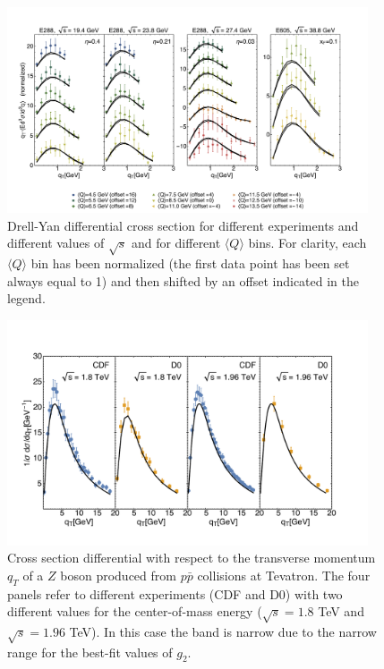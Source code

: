 \documentclass[aps,preprintnumbers,showpacs,nofootinbib,superscriptaddress,floatfix]{revtex4}
\begin{document}
\begin{figure}[h!]
\centering
\includegraphics[width=0.95\textwidth]{plots/DY_SCIplot_flINDEP.pdf}
\caption{Drell-Yan differential cross section for different experiments and
  different values of $\sqrt{s}$ and for different $\langle Q \rangle$
  bins. For clarity, each $\langle Q \rangle$ bin has been normalized 
  (the first data point has been set always equal to 1) and then shifted by an
  offset indicated in the legend.}
\label{f:DY_panel}
\end{figure}
\begin{figure}[h!]
\begin{center}
\includegraphics[width=0.95\textwidth]{plots/Z_SCIplot_flINDEP.pdf}
\end{center}
\caption{Cross section differential with respect to the transverse momentum $q_T$ of a $Z$ boson produced from $p\bar{p}$ collisions at Tevatron. The four panels refer to different experiments (CDF and D$0$) with two different values for the center-of-mass energy ($\sqrt{s} = 1.8$ TeV and $\sqrt{s}=1.96$ TeV). In this case the band is narrow due to the narrow range for the best-fit values of $g_2$.} 
\label{f:Z_qT}
\end{figure}
\end{document}
